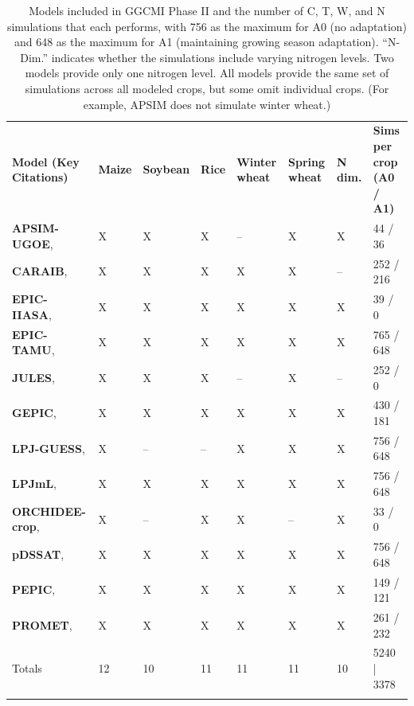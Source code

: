 \documentclass[gmd, manuscript]{copernicus} %
\begin{document}
\begin{table}[t]
\caption{Models included in GGCMI Phase II and the number of C, T, W, and N simulations that each performs, with 756 as the maximum for A0 (no adaptation) and 648 as the maximum for A1 (maintaining growing season adaptation). 
``N-Dim.'' indicates whether the simulations include varying nitrogen levels. Two models provide only one nitrogen level. 
All models provide the same set of simulations across all modeled crops, but some omit individual crops. (For example, APSIM does not simulate winter wheat.)}
\label{table:models}
	\begin{tabular}{p{6cm} p{1cm} p{1cm} p{1cm} p{1cm} p{1cm} p{1cm} p{1.9cm}}
        \tophline
		{\textbf{Model (Key Citations)}}&{\textbf{Maize}}&{\textbf{Soybean}}&{\textbf{Rice}}&{\textbf{Winter wheat}}&{\textbf{Spring wheat}}&{\textbf{N dim.}}&{\textbf{Sims per crop (A0 / A1)}}\\ \middlehline
        {\textbf{APSIM-UGOE},   \citet{KEATING2003267, HOLZWORTH2014327}} & {X} & {X} & {X} & {--} & {X} & {X} & {44 / 36}\\ \middlehline
        {\textbf{CARAIB},       \citet{Dury2011, Pirttioja2015}} & {X} & {X} & {X} & {X} & {X} & {--} & {252 / 216}\\ \middlehline
        {\textbf{EPIC-IIASA},   \citet{BALKOVIC2014}} & {X} & {X} & {X} & {X} & {X} & {X} & {39 / 0}\\  \middlehline
        {\textbf{EPIC-TAMU},    \citet{Izaurralde06}} & {X} & {X} & {X} & {X} & {X} & {X} & {765 / 648}\\ \middlehline
        {\textbf{JULES},        \citet{Osborne2015, Williams2015, Williams2017}} & {X} & {X} & {X} & {--} & {X} & {--} & {252 / 0}\\ \middlehline
        {\textbf{GEPIC},        \citet{LIU2007478, FOLBERTH201221}} & {X} & {X} & {X} & {X} & {X} & {X} & {430 / 181}\\ \middlehline
        {\textbf{LPJ-GUESS},    \citet{Lindeskog2013, Olin2015}} & {X} & {--} & {--} & {X} & {X} & {X} & {756 / 648}\\  \middlehline
        {\textbf{LPJmL},        \citet{von_Bloh_implementing_2018}} & {X} & {X} & {X} & {X} & {X} & {X} & {756 / 648}\\ \middlehline
        {\textbf{ORCHIDEE-crop},\citet{Wu2016}} & {X} & {--} & {X} & {X} & {--} & {X} & {33 / 0}\\ \middlehline
        {\textbf{pDSSAT},       \citet{Elliott2014b, JONES2003235}} & {X} & {X} & {X} & {X} & {X} & {X} & {756 / 648}\\ \middlehline
        {\textbf{PEPIC},        \citet{LIU2016164, LIU2016}} & {X} & {X} & {X} & {X} & {X} & {X} & {149 / 121}\\ \middlehline
        {\textbf{PROMET},       \citet{Hank2015, MAUSER2015}} & {X} & {X} & {X} & {X} & {X} & {X} & {261 / 232}\\ \middlehline
        {Totals} & {12} & {10} & {11} & {11} & {11} & {10} & {5240 | 3378}\\
        \bottomhline
    \end{tabular}
\end{table}
\end{document}

